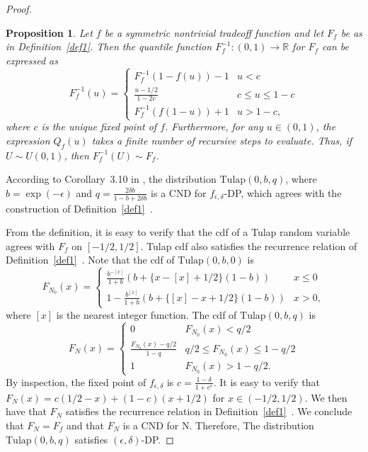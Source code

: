 \documentclass{article}
\newtheorem{prop}{Proposition}
\begin{document}
\begin{proof}
\begin{prop}\label{prop1}   %
    Let $f$ be a symmetric nontrivial tradeoff function and let $F_f$ be as in Definition~\ref{def1}. 
    Then the quantile function $F_f^{-1}:(0,1)\rightarrow \mathbb{R}$ for $F_f$ can be expressed as
    \[F_f^{-1}(u) = \begin{cases}
    F_f^{-1}(1-f(u))-1&u<c\\
    \frac{u-1/2}{1-2c}&c\leq u\leq 1-c\\
    F_f^{-1}(f(1-u))+1&u>1-c,
    \end{cases}\]
    where $c$ is the unique fixed point of $f$. 
    {Furthermore, for any $u\in (0,1)$, the expression $Q_f(u)$ takes a finite number of recursive steps to evaluate. Thus,} 
    if $U\sim U(0,1)$, then $F_f^{-1}(U) \sim F_f$. 
\end{prop}

According to Corollary~3.10 in \cite{awan2023canonical}, 
the distribution $\mathrm{Tulap}(0,b,q)$, where $b=\exp(-\epsilon)$ and $q = \frac{2\delta b}{1-b+2\delta b}$ 
is a CND for $f_{\epsilon,\delta}$-DP, which agrees with the construction of Definition~\ref{def1}~\parencite{awan2023canonical}. 

From the definition, it is easy to verify that the cdf of a Tulap random variable agrees with $F_f$ on $[-1/2,1/2]$. 
Tulap cdf also satisfies the recurrence relation of Definition~\ref{def1}~\parencite{awan2023canonical}. 
Note that the cdf of $\mathrm{Tulap}(0,b,0)$ is 
\[F_{N_0}(x) = \begin{cases}
    \frac{b^{-[x]}}{1+b}(b+\{x-[x]+1/2\}(1-b))& x\leq 0\\
    1- \frac{b^{[x]}}{1+b}(b+\{[x]-x+1/2\}(1-b))&x>0,
\end{cases}\]
where $[x]$ is the nearest integer function. 
The cdf of $\mathrm{Tulap}(0,b,q)$ is
\[F_N(x) = \begin{cases}
    0&F_{N_0}(x)<q/2\\
    \frac{F_{N_0}(x)-q/2}{1-q}& q/2\leq F_{N_0}(x)\leq 1-q/2\\
    1&F_{N_0}(x)>1-q/2.
\end{cases}\]
By inspection, the fixed point of $f_{\epsilon,\delta}$ is $c=\frac{1-\delta}{1+e^\epsilon}$. 
It is easy to verify that $F_N(x) = c(1/2-x) + (1-c)(x+1/2)$ for $x\in (-1/2,1/2)$. 
We then have that $F_N$ satisfies the recurrence relation in Definition~\ref{def1}~\parencite{awan2023canonical}. 
We conclude that $F_N = F_f$ and that $F_N$ is a CND for N. Therefore, The distribution $\mathrm{Tulap}(0,b,q)$ satisfies $(\epsilon, \delta)$-DP.
\end{proof}

\printbibliography
\end{document}
